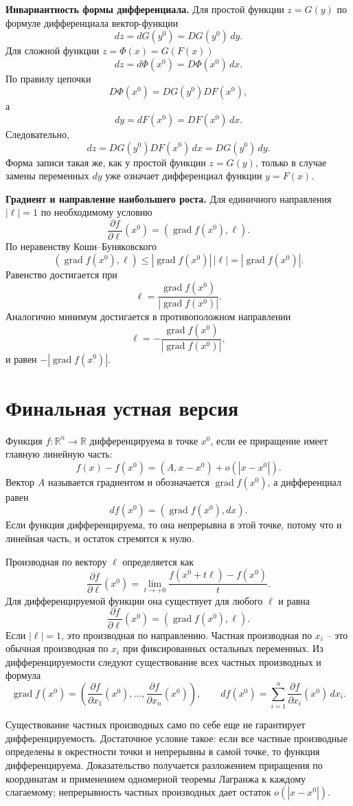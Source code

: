 \documentclass[12pt,a4paper]{article}
\newcommand{\R}{\mathbb{R}}
\newcommand{\grad}{\operatorname{grad}}
\newcommand{\Jac}{D}
\begin{document}
\textbf{Инвариантность формы дифференциала.}
Для простой функции \(z=G(y)\) по формуле дифференциала вектор-функции
\[
  dz=dG(y^0)=\Jac G(y^0)\,dy.
\]
Для сложной функции \(z=\Phi(x)=G(F(x))\)
\[
  dz=d\Phi(x^0)=\Jac\Phi(x^0)\,dx.
\]
По правилу цепочки
\[
  \Jac\Phi(x^0)=\Jac G(y^0)\Jac F(x^0),
\]
а
\[
  dy=dF(x^0)=\Jac F(x^0)\,dx.
\]
Следовательно,
\[
  dz=\Jac G(y^0)\Jac F(x^0)\,dx=\Jac G(y^0)\,dy.
\]
Форма записи такая же, как у простой функции \(z=G(y)\), только в случае
замены переменных \(dy\) уже означает дифференциал функции \(y=F(x)\).

\textbf{Градиент и направление наибольшего роста.}
Для единичного направления \(|\ell|=1\) по необходимому условию
\[
  \frac{\partial f}{\partial\ell}(x^0)=(\grad f(x^0),\ell).
\]
По неравенству Коши--Буняковского
\[
  (\grad f(x^0),\ell)\le |\grad f(x^0)|\,|\ell|=|\grad f(x^0)|.
\]
Равенство достигается при
\[
  \ell=\frac{\grad f(x^0)}{|\grad f(x^0)|}.
\]
Аналогично минимум достигается в противоположном направлении
\[
  \ell=-\frac{\grad f(x^0)}{|\grad f(x^0)|},
\]
и равен \(-|\grad f(x^0)|\).

\section*{Финальная устная версия}

Функция \(f:\R^n\to\R\) дифференцируема в точке \(x^0\), если ее приращение
имеет главную линейную часть:
\[
  f(x)-f(x^0)=(A,x-x^0)+o(|x-x^0|).
\]
Вектор \(A\) называется градиентом и обозначается \(\grad f(x^0)\), а
дифференциал равен
\[
  df(x^0)=(\grad f(x^0),dx).
\]
Если функция дифференцируема, то она непрерывна в этой точке, потому что и
линейная часть, и остаток стремятся к нулю.

Производная по вектору \(\ell\) определяется как
\[
  \frac{\partial f}{\partial\ell}(x^0)=
  \lim_{t\to+0}\frac{f(x^0+t\ell)-f(x^0)}{t}.
\]
Для дифференцируемой функции она существует для любого \(\ell\) и равна
\[
  \frac{\partial f}{\partial\ell}(x^0)=(\grad f(x^0),\ell).
\]
Если \(|\ell|=1\), это производная по направлению. Частная производная по
\(x_i\) -- это обычная производная по \(x_i\) при фиксированных остальных
переменных. Из дифференцируемости следуют существование всех частных
производных и формула
\[
  \grad f(x^0)=
  \left(
    \frac{\partial f}{\partial x_1}(x^0),\dots,
    \frac{\partial f}{\partial x_n}(x^0)
  \right),
  \qquad
  df(x^0)=\sum_{i=1}^n\frac{\partial f}{\partial x_i}(x^0)\,dx_i.
\]

Существование частных производных само по себе еще не гарантирует
дифференцируемость. Достаточное условие такое: если все частные производные
определены в окрестности точки и непрерывны в самой точке, то функция
дифференцируема. Доказательство получается разложением приращения по
координатам и применением одномерной теоремы Лагранжа к каждому слагаемому;
непрерывность частных производных дает остаток \(o(|x-x^0|)\).
\end{document}
